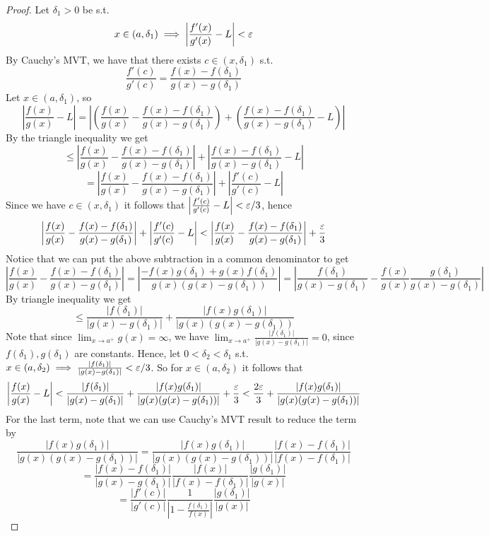 \begin{proof}
  Let $\delta_1>0$ be s.t. 
  \[ x\in (a,\delta_1) \implies \left| \frac{f'(x)}{g'(x)}- L\right| < \varepsilon\]
  By Cauchy's MVT, we have that there exists $c\in(x,\delta_1)$ s.t. 
  \[\frac{f'(c)}{g'(c)}= \frac{f(x)-f(\delta_1)}{g(x)-g(\delta_1)}\]
  Let $x\in (a,\delta_1)$, so 
  \[\left| \frac{f(x)}{g(x)} -L\right| = \left|
  \left(\frac{f(x)}{g(x)}-\frac{f(x)-f(\delta_1)}{g(x)-g(\delta_1)}\right) +
  \left(\frac{f(x)-f(\delta_1)}{g(x)-g(\delta_1)} - L\right)\right| \]
  By the triangle inequality we get
  \[\leq \left|\frac{f(x)}{g(x)}-\frac{f(x)-f(\delta_1)}{g(x)-g(\delta_1)}\right| +
  \left|\frac{f(x)-f(\delta_1)}{g(x)-g(\delta_1)} - L\right| \]
  \[= \left|\frac{f(x)}{g(x)}-\frac{f(x)-f(\delta_1)}{g(x)-g(\delta_1)}\right| +
  \left|\frac{f'(c)}{g'(c)} - L\right| \]
  Since we have $c\in (x,\delta_1)$ it follows that $\left|\frac{f'(c)}{g'(c)} -
  L\right|<\varepsilon/3$, hence 
  \[\left|\frac{f(x)}{g(x)}-\frac{f(x)-f(\delta_1)}{g(x)-g(\delta_1)}\right| +
  \left|\frac{f'(c)}{g'(c)} - L\right|  <
  \left|\frac{f(x)}{g(x)}-\frac{f(x)-f(\delta_1)}{g(x)-g(\delta_1)}\right| +
  \frac{\varepsilon}{3}\]
  Notice that we can put the above subtraction in a common denominator to get
  \[\left|\frac{f(x)}{g(x)}-\frac{f(x)-f(\delta_1)}{g(x)-g(\delta_1)}\right|= \left|
    \frac{-f(x)g(\delta_1) + g(x)f(\delta_1)}{g(x)(g(x)-g(\delta_1))}
  \right| = \left|
  \frac{f(\delta_1)}{g(x)-g(\delta_1)} -
  \frac{f(x)}{g(x)}\frac{g(\delta_1)}{g(x)-g(\delta_1)}
  \right|\]
  By triangle inequality we get 
  \[\leq \frac{|f(\delta_1)|}{|g(x)-g(\delta_1)|} +
  \frac{|f(x)g(\delta_1)|}{|g(x)(g(x)-g(\delta_1))}\]
  Note that since $\lim_{x\to a^{+}} g(x)=\infty$, we have $\lim_{x\to
  a^+}\frac{|f(\delta_1)|}{|g(x)-g(\delta_1)|}=0$, since $f(\delta_1), g(\delta_1)$ are
  constants. Hence, let $0<\delta_2<\delta_1$ s.t. $x\in(a,\delta_2)\implies
  \frac{|f(\delta_1)|}{|g(x)-g(\delta_1)|}<\varepsilon/3$. So for $x\in(a,\delta_2)$ it follows
  that 
  \[\left| \frac{f(x)}{g(x)} -L\right| < \frac{|f(\delta_1)|}{|g(x)-g(\delta_1)|} +
  \frac{|f(x)g(\delta_1)|}{|g(x)(g(x)-g(\delta_1))|} + \frac{\varepsilon}{3}<
  \frac{2\varepsilon}{3} + \frac{|f(x)g(\delta_1)|}{|g(x)(g(x)-g(\delta_1))|}\]
  For the last term, note that we can use Cauchy's MVT result to reduce the term by 
  \[\frac{|f(x)g(\delta_1)|}{|g(x)(g(x)-g(\delta_1))|} =
    \frac{|f(x)g(\delta_1)|}{|g(x)(g(x)-g(\delta_1))|}
    \frac{|f(x)-f(\delta_1)|}{|f(x)-f(\delta_1)|}\]
  \[= \frac{|f(x)-f(\delta_1)|}{|g(x)-g(\delta_1)|}
  \frac{|f(x)|}{|f(x)-f(\delta_1)|}\frac{|g(\delta_1)|}{|g(x)|}\]
  \[= \frac{|f'(c)|}{|g'(c)|}
  \frac{1}{|1-\frac{f(\delta_1)}{f(x)}|}\frac{|g(\delta_1)|}{|g(x)|}\]

\end{proof}
